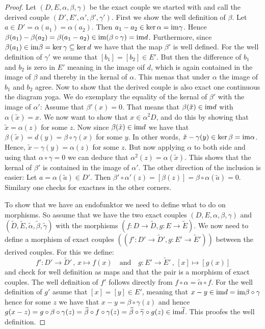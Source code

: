 \begin{proof}
	Let $(D,E,\alpha,\beta,\gamma)$ be the exact couple we started with and call the derived couple $(D',E',\alpha',\beta',\gamma')$.
	First we show the well definition of $\beta$. Let $a\in D'=\alpha(a_1)=\alpha(a_2)$. Then $a_1-a_2\in \ker\alpha=\mathrm{im} \gamma $. Hence $\beta(a_1)-\beta(a_2)=\beta(a_1-a_2)\in \mathrm{im} (\beta\circ \gamma)=\mathrm{im} d$. Furthermore, since $\beta(a_1)\in \mathrm{im} \beta=\ker\gamma \subseteq \ker d$ we have that the map $\beta'$ is well defined. For the well definition of $\gamma'$ we ssume that $[b_1]=[b_2]\in E'$. But then the difference of $b_1$ and $b_2$ is zero in $E'$ meaning in the image oif $d$, which is again contained in the image of $\beta$ and thereby in the kernal of $\alpha$. This menas that under $\alpha$ the image of $b_1$ and $b_2$ agree.
	Now to show that the derived couple is also exact one continuous the diagram yoga. We do exemplary the equality of the kernal of $\beta'$ with the image of $\alpha'$:
	Assume that $\beta'(x)=0$. That means that $\beta(\tilde{x})\in \mathrm{im} d$ with $\alpha(\tilde{x})=x$. We now want to show that $x\in \alpha^2D$, and do this by showing that $\tilde{x}=\alpha(z)$ for some $z$. Now since $\beta(\tilde{x})\in \mathrm{im} d$ we have that $\beta(\tilde{x})=d(y)=\beta\circ \gamma(x)$ for some $y$. In other words, $\tilde{x}-\gamma(y)\in \ker \beta=\mathrm{im} \alpha$. Hence, $\tilde{x}-\gamma(y)=\alpha(z)$ for some $z$. But now applying $\alpha$ to both side and using that $\alpha\circ \gamma=0$ we can deduce that $\alpha^2(z)=\alpha(\tilde{x})$. This shows that the kernal of $\beta'$ is contained in the image of $\alpha'$. The other direction of the inclusion is easier: Let $a=\alpha(\tilde{a}) \in D'$. Then $\beta'\circ \alpha'(z)=[\beta(z)]=\beta\circ \alpha (\tilde{a})=0$. Similary one checks for exactnes in the other corners.


	To show that we have an endofunktor we need to define what to do on morphisms. So assume that we have the two exact couples $(D,E,\alpha,\beta,\gamma)$ and $(\widetilde{D},\widetilde{E},\widetilde{\alpha},\widetilde{\beta},\widetilde{\gamma})$ with the morphisms $(f:D\to \widetilde{D},g:E\to \widetilde{E})$. We now need to define a morphism of exact couples $((f':D'\to \widetilde{D}',g:E'\to \widetilde{E}'))$ between the derived couples. For this we define:
	\begin{equation*}
		f':D'\to \widetilde{D}'\,,\,x\mapsto f(x) \quad \text{and}\quad g:E'\to \widetilde{E}'\,,\, [x]\mapsto [g(x)]
	\end{equation*} and check for well definition as maps and that the pair is a morphism of exact couples. The well definition of $f'$ follows directly from $f\circ \alpha=\widetilde{\alpha}\circ f$. For the well definition of $g'$ asume that $[x]=[y]\in E'$, meaning that $x-y\in \mathrm{im} d=\mathrm{im} \beta \circ \gamma$ hence for some $z$ we have that $x-y=\beta\circ \gamma(z)$ and hence $g(x-z)=g\circ \beta \circ \gamma (z)=\widetilde{\beta}\circ f\circ \gamma(z)=\widetilde{\beta}\circ \widetilde{\gamma}\circ g(z)\in \mathrm{im} \widetilde{d}$. This proofes the well definition.
\end{proof}

